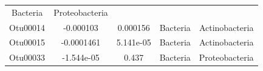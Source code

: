 \documentclass[]{article}
\begin{document}
\begin{longtable}[]{@{}ccccc@{}}
\begin{minipage}[t]{0.13\columnwidth}
Bacteria\strut
\end{minipage} & \begin{minipage}[t]{0.20\columnwidth}\centering\strut
Proteobacteria\strut
\end{minipage}\tabularnewline
\begin{minipage}[t]{0.13\columnwidth}\centering\strut
Otu00014\strut
\end{minipage} & \begin{minipage}[t]{0.16\columnwidth}\centering\strut
-0.000103\strut
\end{minipage} & \begin{minipage}[t]{0.14\columnwidth}\centering\strut
0.000156\strut
\end{minipage} & \begin{minipage}[t]{0.13\columnwidth}\centering\strut
Bacteria\strut
\end{minipage} & \begin{minipage}[t]{0.20\columnwidth}\centering\strut
Actinobacteria\strut
\end{minipage}\tabularnewline
\begin{minipage}[t]{0.13\columnwidth}\centering\strut
Otu00015\strut
\end{minipage} & \begin{minipage}[t]{0.16\columnwidth}\centering\strut
-0.0001461\strut
\end{minipage} & \begin{minipage}[t]{0.14\columnwidth}\centering\strut
5.141e-05\strut
\end{minipage} & \begin{minipage}[t]{0.13\columnwidth}\centering\strut
Bacteria\strut
\end{minipage} & \begin{minipage}[t]{0.20\columnwidth}\centering\strut
Actinobacteria\strut
\end{minipage}\tabularnewline
\begin{minipage}[t]{0.13\columnwidth}\centering\strut
Otu00033\strut
\end{minipage} & \begin{minipage}[t]{0.16\columnwidth}\centering\strut
-1.544e-05\strut
\end{minipage} & \begin{minipage}[t]{0.14\columnwidth}\centering\strut
0.437\strut
\end{minipage} & \begin{minipage}[t]{0.13\columnwidth}\centering\strut
Bacteria\strut
\end{minipage} & \begin{minipage}[t]{0.20\columnwidth}\centering\strut
Proteobacteria\strut
\end{minipage}\tabularnewline
\bottomrule
\end{longtable}
\end{document}
